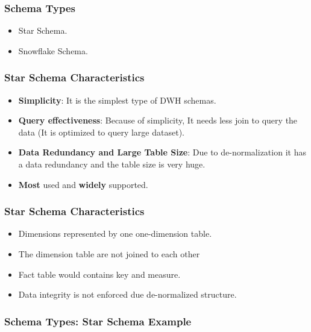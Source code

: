 \VideoClassification[column=2, colour=red]

\begin{frame}
\frametitle{Schema Types}
	\begin{itemize}[<+->]
		\item Star Schema.
		\item Snowflake Schema.
	\end{itemize}

\end{frame}
\begin{frame}
	\frametitle{Star Schema Characteristics}
	\begin{itemize}[<+->]
		\item \textbf{Simplicity}: It is the simplest type of DWH schemas.
		\item \textbf{Query effectiveness}: Because of simplicity, It needs less join to query the data (It is optimized to query large dataset).
		\item \textbf{Data Redundancy and Large Table Size}: Due to de-normalization it has a data redundancy and the table size is very huge.
		\item \textbf{Most} used and \textbf{widely} supported.
	\end{itemize}
\end{frame}
\begin{frame}
\frametitle{Star Schema Characteristics}
	\begin{itemize}[<+->]
		\item Dimensions represented by one one-dimension table.
		\item The dimension table are not joined to each other
		\item Fact table would contains key and measure.
		\item Data integrity is not enforced due de-normalized structure.
	\end{itemize}
\end{frame}
\begin{frame}
\frametitle{Schema Types: Star Schema Example}

\end{frame}
